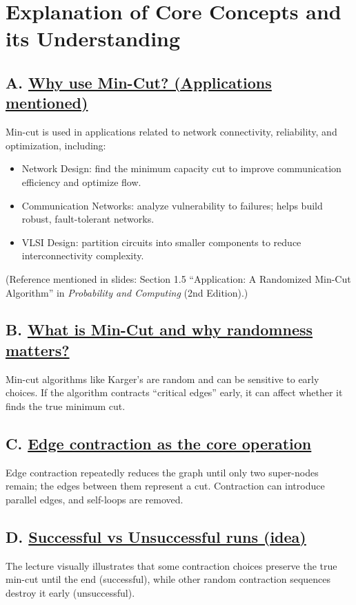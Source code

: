 \documentclass[11pt]{article}
\begin{document}
\section{Explanation of Core Concepts and its Understanding}

\subsection*{A. \underline{Why use Min-Cut? (Applications mentioned)}}
Min-cut is used in applications related to network connectivity, reliability, and optimization, including:
\begin{itemize}
\item Network Design: find the minimum capacity cut to improve communication efficiency and optimize flow.
\item Communication Networks: analyze vulnerability to failures; helps build robust, fault-tolerant networks.
\item VLSI Design: partition circuits into smaller components to reduce interconnectivity complexity.
\end{itemize}
(Reference mentioned in slides: Section 1.5 ``Application: A Randomized Min-Cut Algorithm'' in \textit{Probability and Computing} (2nd Edition).)

\subsection*{B. \underline{What is Min-Cut and why randomness matters?}}
Min-cut algorithms like Karger’s are random and can be sensitive to early choices. If the algorithm contracts ``critical edges'' early, it can affect whether it finds the true minimum cut.

\subsection*{C. \underline{Edge contraction as the core operation}}
Edge contraction repeatedly reduces the graph until only two super-nodes remain; the edges between them represent a cut. Contraction can introduce parallel edges, and self-loops are removed.

\subsection*{D. \underline{Successful vs Unsuccessful runs (idea)}}
The lecture visually illustrates that some contraction choices preserve the true min-cut until the end (successful), while other random contraction sequences destroy it early (unsuccessful).
\end{document}
